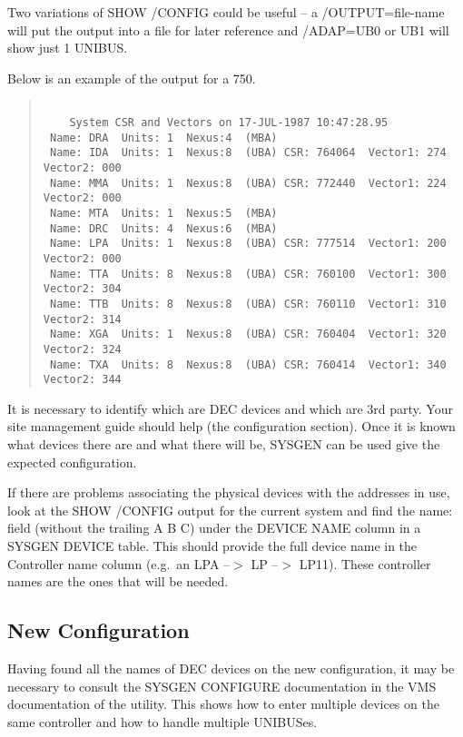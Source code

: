 Two variations of SHOW /CONFIG could be useful -- a /OUTPUT=file-name
 will put the output into a file for later reference and /ADAP=UB0 or UB1
 will show just 1 UNIBUS.

Below is an example of the output for a 750.
\begin{quote}
\begin{verbatim}

	System CSR and Vectors on 17-JUL-1987 10:47:28.95
 Name: DRA  Units: 1  Nexus:4  (MBA)
 Name: IDA  Units: 1  Nexus:8  (UBA) CSR: 764064  Vector1: 274  Vector2: 000
 Name: MMA  Units: 1  Nexus:8  (UBA) CSR: 772440  Vector1: 224  Vector2: 000
 Name: MTA  Units: 1  Nexus:5  (MBA)
 Name: DRC  Units: 4  Nexus:6  (MBA)
 Name: LPA  Units: 1  Nexus:8  (UBA) CSR: 777514  Vector1: 200  Vector2: 000
 Name: TTA  Units: 8  Nexus:8  (UBA) CSR: 760100  Vector1: 300  Vector2: 304
 Name: TTB  Units: 8  Nexus:8  (UBA) CSR: 760110  Vector1: 310  Vector2: 314
 Name: XGA  Units: 1  Nexus:8  (UBA) CSR: 760404  Vector1: 320  Vector2: 324
 Name: TXA  Units: 8  Nexus:8  (UBA) CSR: 760414  Vector1: 340  Vector2: 344

\end{verbatim}
\end{quote}

It is necessary to identify which are DEC devices and which are 3rd party.
Your  site management guide should help (the configuration section).
Once it is known what devices there are and what there will be, SYSGEN can
be used give the expected configuration.


If there are problems associating the physical devices with the addresses
in use, look at the SHOW /CONFIG output for the current
 system and find the name: field (without the trailing A B C) under the
 DEVICE NAME column in a SYSGEN DEVICE table.
 This should provide the full  device name in the Controller name column
 (e.g.\ an LPA --$>$ LP --$>$ LP11).
These controller names are the ones that will be needed.

\subsection{New Configuration}

Having found all the names of DEC devices on the new configuration, it may be
necessary to consult the SYSGEN  CONFIGURE documentation in the VMS
documentation of the utility.
This shows how to enter multiple devices on the same controller and
how to handle multiple UNIBUSes.

